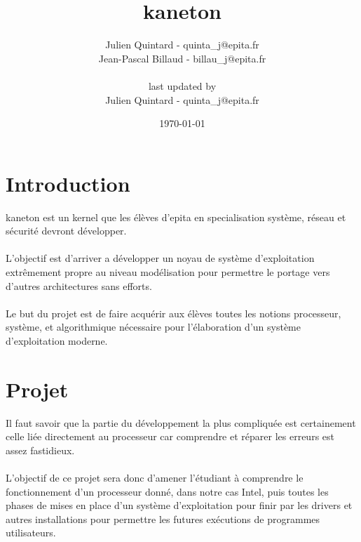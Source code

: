 \documentclass[10pt,a4wide]{article}
\title{kaneton}
\author{Julien Quintard - \small{quinta\_j@epita.fr} \\
        Jean-Pascal Billaud - \small{billau\_j@epita.fr} \\ \\
        \small{last updated by} \\
        Julien Quintard - \small{quinta\_j@epita.fr}}
\date{\today}
\begin{document}
\maketitle

\tableofcontents

\newpage

\section{Introduction}

kaneton est un kernel que les \'el\`eves d'epita en specialisation syst\`eme,
r\'eseau et s\'ecurit\'e devront d\'evelopper.

\paragraph{}

L'objectif est d'arriver a d\'evelopper un noyau de syst\`eme d'exploitation
extr\^emement propre au niveau mod\'elisation pour permettre le portage
vers d'autres architectures sans efforts.

\paragraph{}

Le but du projet est de faire acqu\'erir aux \'el\`eves toutes les notions
processeur, syst\`eme, et algorithmique n\'ecessaire pour l'\'elaboration
d'un syst\`eme d'exploitation moderne.

\newpage

\section{Projet}

Il faut savoir que la partie du d\'eveloppement la plus compliqu\'ee est
certainement celle li\'ee directement au processeur car comprendre
et r\'eparer les erreurs est assez fastidieux.

\paragraph{}

L'objectif de ce projet sera donc d'amener l'\'etudiant \`a comprendre le
fonctionnement d'un processeur donn\'e, dans notre cas Intel, puis toutes
les phases de mises en place d'un syst\`eme d'exploitation pour finir
par les drivers et autres installations pour permettre les futures ex\'ecutions
de programmes utilisateurs.
\end{document}
